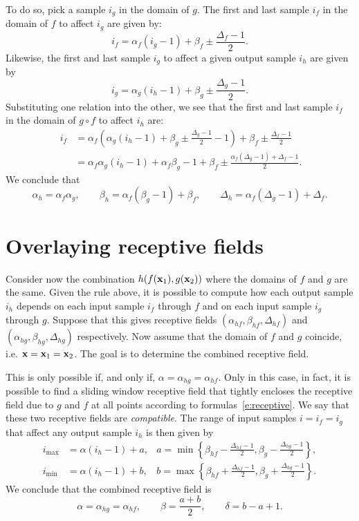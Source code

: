 To do so, pick a sample $i_g$ in the domain of $g$. The first and last sample $i_f$ in the domain of $f$ to affect $i_g$ are given by:
\[
  i_f = \alpha_f (i_g- 1) + \beta_f \pm \frac{\Delta_f - 1}{2}.
\]
Likewise, the first and last sample $i_g$ to affect a given output sample $i_h$ are given by
\[
  i_g = \alpha_g (i_h- 1) + \beta_g \pm \frac{\Delta_g - 1}{2}.
\]
Substituting one relation into the other, we see that the first and last sample $i_f$ in the domain of $g \circ f$ to affect $i_h$ are:
\begin{align*}\
 i_f &= \alpha_f \left(\alpha_g (i_h- 1) + \beta_g \pm \frac{\Delta_g - 1}{2} - 1\right) + \beta_f \pm \frac{\Delta_f - 1}{2}	
 \\
&= \alpha_f\alpha_g (i_h-1)
 + \alpha_f \beta_g - 1 + \beta_f
 \pm \frac{\alpha_f (\Delta_g - 1) + \Delta_f -1}{2}.
\end{align*}
We conclude that
\[
\alpha_h = \alpha_f \alpha_g,
\qquad
\beta_h =  \alpha_f (\beta_g - 1) + \beta_f,
\qquad
\Delta_h = \alpha_f (\Delta_g - 1) + \Delta_f.
\]

\section{Overlaying receptive fields}\label{s:receptive-overlying}

Consider now the combination $h(f(\mathbf{x}_1), g(\mathbf{x}_2))$ where the domains of $f$ and $g$ are the same. Given the rule above, it is possible to compute how each output sample $i_h$ depends on each input sample $i_f$ through $f$ and on each input sample $i_g$ through $g$. Suppose that this gives receptive fields $(\alpha_{hf}, \beta_{hf}, \Delta_{hf})$ and $(\alpha_{hg}, \beta_{hg}, \Delta_{hg})$ respectively. Now assume that the domain of $f$ and $g$ coincide, i.e. $\mathbf{x} = \mathbf{x}_1 = \mathbf{x}_2$. The goal is to determine the combined receptive field.

This is only possible if, and only if, $\alpha = \alpha_{hg} = \alpha_{hf}$. Only in this case, in fact, it is possible to find a sliding window receptive field that tightly encloses the receptive field due to $g$ and $f$ at all points according to formulas~\eqref{e:receptive}. We say that these two receptive fields are \emph{compatible}. The range of input samples $i = i_f = i_g$ that affect any output sample $i_h$ is then given by
\begin{align*}
	  i_\text{max}&=
  \alpha (i_h- 1) + a, & a = \min
  \left\{\beta_{hf}- \frac{\Delta_{hf} - 1}{2}, \beta_g - \frac{\Delta_{hg} - 1}{2}\right\},
  \\
  	  i_\text{min} &=
  \alpha (i_h- 1) + b, & b = \max
  \left\{\beta_{hf}+ \frac{\Delta_{hf} - 1}{2}, \beta_g + \frac{\Delta_{hg} - 1}{2}\right\}.
\end{align*}
We conclude that the combined receptive field is
\[
\alpha = \alpha_{hg} = \alpha_{hf},
\qquad
\beta = \frac{a+b}{2},
\qquad
\delta = b - a + 1.
\]



